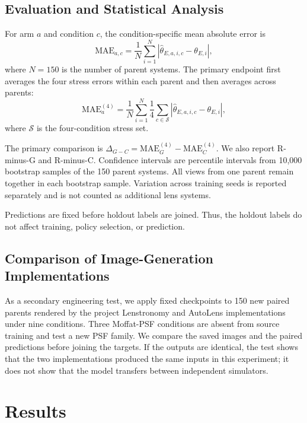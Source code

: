 \documentclass[letterpaper]{article}
\begin{document}
\subsection{Evaluation and Statistical Analysis}

For arm $a$ and condition $c$, the condition-specific mean absolute error is
\begin{equation}
\mathrm{MAE}_{a,c} =
\frac{1}{N}\sum_{i=1}^{N}
\left|\widehat{\theta}_{E,a,i,c}-\theta_{E,i}\right|,
\end{equation}
where $N=150$ is the number of parent systems. The primary endpoint first
averages the four stress errors within each parent and then averages across
parents:
\begin{equation}
\mathrm{MAE}^{(4)}_a =
\frac{1}{N}\sum_{i=1}^{N}\frac{1}{4}
\sum_{c\in\mathcal{S}}
\left|\widehat{\theta}_{E,a,i,c}-\theta_{E,i}\right|,
\end{equation}
where $\mathcal{S}$ is the four-condition stress set.

The primary comparison is
$\Delta_{G-C}=\mathrm{MAE}^{(4)}_G-\mathrm{MAE}^{(4)}_C$. We also report
R-minus-G and R-minus-C. Confidence intervals are percentile intervals from
10,000 bootstrap samples of the 150 parent systems. All views from one parent
remain together in each bootstrap sample. Variation across training seeds is
reported separately and is not counted as additional lens systems.

Predictions are fixed before holdout labels are joined. Thus, the holdout
labels do not affect training, policy selection, or prediction.

\subsection{Comparison of Image-Generation Implementations}

As a secondary engineering test, we apply fixed checkpoints to 150 new paired
parents rendered by the project Lenstronomy and AutoLens implementations under
nine conditions. Three Moffat-PSF conditions are absent from source training
and test a new PSF family. We compare the saved images and the paired
predictions before joining the targets. If the outputs are identical, the test
shows that the two implementations produced the same inputs in this experiment;
it does not show that the model transfers between independent simulators.

\section{Results}
\end{document}
